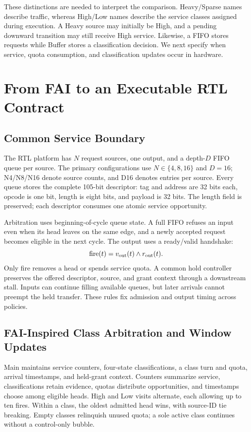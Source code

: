 These distinctions are needed to interpret the comparison. Heavy/Sparse names describe traffic, whereas High/Low names describe the service classes assigned during execution. A Heavy source may initially be High, and a pending downward transition may still receive High service. Likewise, a FIFO stores requests while Buffer stores a classification decision. We next specify when service, quota consumption, and classification updates occur in hardware.

\section{From FAI to an Executable RTL Contract}
\label{sec:rtl}
\subsection{Common Service Boundary}
The RTL platform has $N$ request sources, one output, and a depth-$D$ FIFO queue per source. The primary configurations use $N\in\{4,8,16\}$ and $D=16$; N4/N8/N16 denote source counts, and D16 denotes entries per source. Every queue stores the complete 105-bit descriptor: tag and address are 32 bits each, opcode is one bit, length is eight bits, and payload is 32 bits. The length field is preserved; each descriptor consumes one atomic service opportunity.

Arbitration uses beginning-of-cycle queue state. A full FIFO refuses an input even when its head leaves on the same edge, and a newly accepted request becomes eligible in the next cycle. The output uses a ready/valid handshake:
\begin{equation}
\mathrm{fire}(t)=v_{\rm out}(t)\land r_{\rm out}(t).
\label{eq:fire-v3}
\end{equation}
Only fire removes a head or spends service quota. A common hold controller preserves the offered descriptor, source, and grant context through a downstream stall. Inputs can continue filling available queues, but later arrivals cannot preempt the held transfer. These rules fix admission and output timing across policies.

\subsection{FAI-Inspired Class Arbitration and Window Updates}
Main maintains service counters, four-state classifications, a class turn and quota, arrival timestamps, and held-grant context. Counters summarize service, classifications retain evidence, quotas distribute opportunities, and timestamps choose among eligible heads. High and Low visits alternate, each allowing up to ten fires. Within a class, the oldest admitted head wins, with source-ID tie breaking. Empty classes relinquish unused quota; a sole active class continues without a control-only bubble.

